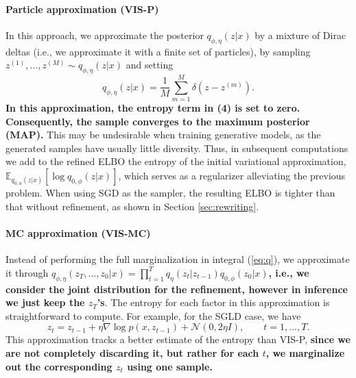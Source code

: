     \paragraph{Particle approximation (VIS-P)} %
    
    In this approach, we approximate the posterior $q_{\phi,\eta}(z|x)$ by a mixture of Dirac deltas (i.e., we approximate it with a finite set of particles), by sampling $z^{(1)}, \ldots, z^{(M)} \sim q_{\phi,\eta}(z|x)$ and setting 
    $$
    q_{\phi,\eta}(z|x) = \frac{1}{M} \sum_{m=1}^M \delta(z - z^{(m)}).
    $$
    {\bf In this approximation, the entropy term in (4) is  set to zero. Consequently,  the sample converges to the 
    maximum posterior (MAP).}  This may be undesirable when  training generative models, as the generated samples have usually little diversity. Thus, in subsequent computations we add to the refined ELBO the entropy of the initial variational approximation, $\mathbb{E}_{q_{0,\phi}(z|x)} \left[ \log q_{0,\phi}(z | x) \right]$, which
    serves as a regularizer alleviating the previous problem. When using SGD as the sampler, the resulting ELBO is tighter than that without refinement,
    as shown in Section \ref{sec:rewriting}. 
    
    
    
    \paragraph{MC approximation (VIS-MC)} Instead of performing the full marginalization in integral (\ref{eq:q}), we approximate it through  {\bf   $q_{\phi,\eta}(z_T,\ldots, z_0|x) = \prod_{t=1}^T q_\eta(z_t | z_{t-1}) q_{0,\phi}(z_0|x)$, i.e., we consider the joint distribution for the refinement, however in inference we just keep the $z_T$'s}. The entropy for each factor in this 
    approximation is straightforward to compute. For 
    example, for the SGLD case, we have
    {\bf
    $$ 
    z_t = z_{t-1} + \eta \nabla \log p(x, z_{t-1}) + \mathcal{N}(0, 2\eta I),\qquad  t=1, ..., T.
    $$
    }
    This approximation tracks a better estimate of the entropy than 
    VIS-P, {\bf since we are not completely discarding it, but rather for each $t$, we marginalize out the corresponding $z_t$ using one sample.}
